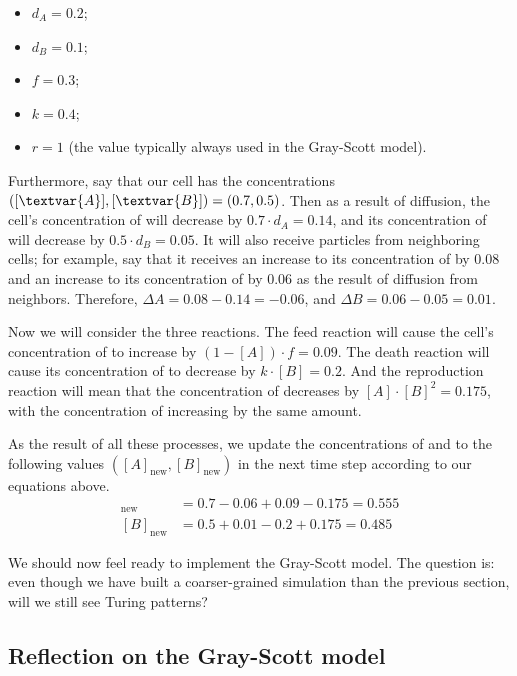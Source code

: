 \begin{itemize}
\item $d_A = 0.2$;
\item $d_B = 0.1$;
\item $f = 0.3$;
\item $k = 0.4$;
\item $r = 1$ (the value typically always used in the Gray-Scott model).
\end{itemize}

Furthermore, say that our cell has the concentrations $([\textvar{A}], [\textvar{B}]) = (0.7, 0.5)$. Then as a result of diffusion, the cell's concentration of  will decrease by $0.7 \cdot d_A = 0.14$, and its concentration of  will decrease by $0.5 \cdot d_B = 0.05$. It will also receive particles from neighboring cells; for example, say that it receives an increase to its concentration of  by 0.08 and an increase to its concentration of  by 0.06 as the result of diffusion from neighbors. Therefore, $\Delta A  = 0.08 - 0.14 = -0.06$, and $\Delta B = 0.06 - 0.05 = 0.01$.

Now we will consider the three reactions. The feed reaction will cause the cell's concentration of  to increase by $(1 - [A]) \cdot f = 0.09$. The death reaction will cause its concentration of  to decrease by $k \cdot [B] = 0.2$. And the reproduction reaction will mean that the concentration of  decreases by $[A] \cdot [B]^2 = 0.175$, with the concentration of  increasing by the same amount.

As the result of all these processes, we update the concentrations of  and  to the following values $([A]_{\text{new}}, [B]_{\text{new}})$ in the next time step according to our equations above.
\begin{align*}
[A]_{\text{new}} & = 0.7 - 0.06 + 0.09 - 0.175 = 0.555\\
[B]_{\text{new}} & = 0.5 + 0.01 - 0.2 + 0.175 = 0.485
\end{align*}

We should now feel ready to implement the Gray-Scott model. The question is: even though we have built a coarser-grained simulation than the previous section, will we still see Turing patterns?

\FloatBarrier
{}
\subsection{Reflection on the Gray-Scott model}

